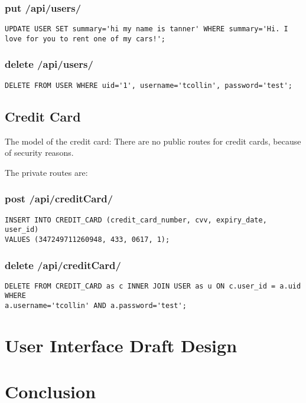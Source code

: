\documentclass{article}
\begin{document}
\subsubsection{put /api/users/}
\begin{lstlisting}
UPDATE USER SET summary='hi my name is tanner' WHERE summary='Hi. I love for you to rent one of my cars!';
\end{lstlisting}

\subsubsection{delete /api/users/}
\begin{lstlisting}
DELETE FROM USER WHERE uid='1', username='tcollin', password='test';
\end{lstlisting}

\subsection{Credit Card}
The model of the credit card:
There are no public routes for credit cards, because of security reasons.

The private routes are:
\subsubsection{post /api/creditCard/}
\begin{lstlisting}
INSERT INTO CREDIT_CARD (credit_card_number, cvv, expiry_date, user_id)
VALUES (347249711260948, 433, 0617, 1);
\end{lstlisting}

\subsubsection{delete /api/creditCard/}
\begin{lstlisting}
DELETE FROM CREDIT_CARD as c INNER JOIN USER as u ON c.user_id = a.uid WHERE
a.username='tcollin' AND a.password='test';
\end{lstlisting}


\section{User Interface Draft Design} %

\section{Conclusion}
\end{document}
